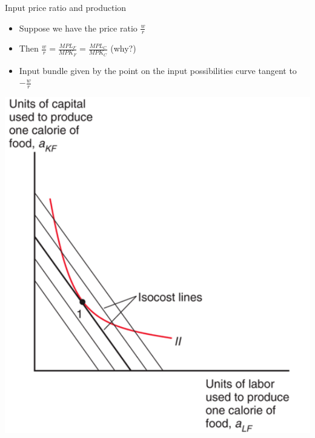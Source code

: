 \documentclass[ignorenonframetext,]{beamer}
\begin{document}
\begin{frame}{Input price ratio and production} 
    \begin{itemize}
        \item Suppose we have the price ratio $\frac{w}{r}$
        \item Then $\frac{w}{r} = \frac{MPL_F}{MPK_F} = \frac{MPL_C}{MPK_C}$ (why?)
        \item Input bundle given by the point on the input possibilities curve tangent to $-\frac{w}{r}$
    \end{itemize}
    \includegraphics[scale=0.15]{input_cost.png}

\end{frame}
\end{document}
